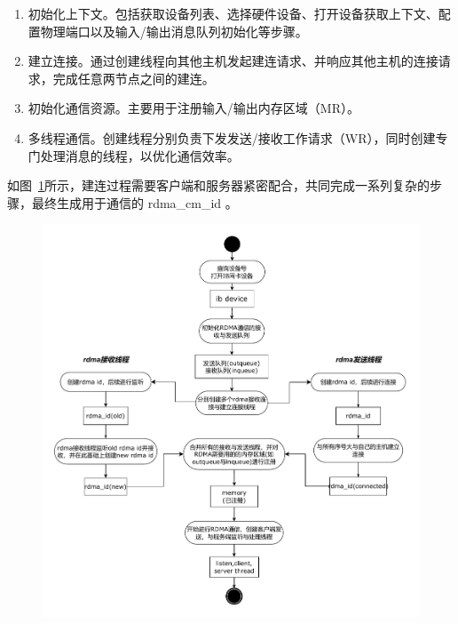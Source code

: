 {    \begin{enumerate}[label=\arabic*.]
        \item 初始化上下文。包括获取设备列表、选择硬件设备、打开设备获取上下文、配置物理端口以及输入/输出消息队列初始化等步骤。
        \item 建立连接。通过创建线程向其他主机发起建连请求、并响应其他主机的连接请求，完成任意两节点之间的建连。
        \item 初始化通信资源。主要用于注册输入/输出内存区域（MR）。
        \item 多线程通信。创建线程分别负责下发发送/接收工作请求（WR），同时创建专门处理消息的线程，以优化通信效率。
    \end{enumerate}

    如图~\ref{fig:mjiajia-cm-connection}所示，建连过程需要客户端和服务器紧密配合，共同完成一系列复杂的步骤，最终生成用于通信的 rdma\_cm\_id 。

    \begin{figure}[H]
        \centering
        \includegraphics[width=\textwidth]{Img/rdma_init.drawio.pdf}
        \label{fig:mjiajia-cm-connection}
    \end{figure}

}
